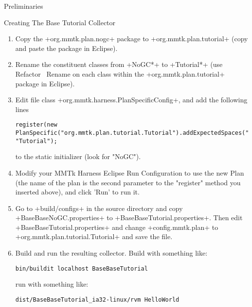 \begin{chapter}{Preliminaries}
\begin{section}{Creating The Base Tutorial Collector}
\begin{enumerate}
  \item Copy the \spverb+org.mmtk.plan.nogc+ package to \spverb+org.mmtk.plan.tutorial+ (copy and paste the package in Eclipse).
  \item Rename the constituent classes from \spverb+NoGC*+ to \spverb+Tutorial*+ (use Refactor \textrightarrow\ Rename on each class within the \spverb+org.mmtk.plan.tutorial+ package in Eclipse).
  \item Edit file class \spverb+org.mmtk.harness.PlanSpecificConfig+, and add the following lines 
     \begin{lstlisting}
register(new PlanSpecific("org.mmtk.plan.tutorial.Tutorial").addExpectedSpaces("default"), "Tutorial");
     \end{lstlisting}
to the static initializer (look for "NoGC").
  \item Modify your MMTk Harness Eclipse Run Configuration to use the new Plan (the name of the plan is the second parameter to the "register" method you inserted above), and click 'Run' to run it.
  \item Go to \spverb+build/configs+ in the source directory and copy \spverb+BaseBaseNoGC.properties+ to \spverb+BaseBaseTutorial.properties+. Then edit \spverb+BaseBaseTutorial.properties+ and change \spverb+config.mmtk.plan+ to \spverb+org.mmtk.plan.tutorial.Tutorial+ and save the file.
  \item Build and run the resulting collector. \newline Build with something like:
    \begin{lstlisting}
bin/buildit localhost BaseBaseTutorial
    \end{lstlisting}
    run with something like:
    \begin{lstlisting}
dist/BaseBaseTutorial_ia32-linux/rvm HelloWorld
    \end{lstlisting}
\end{enumerate}

\end{section}

\end{chapter}
